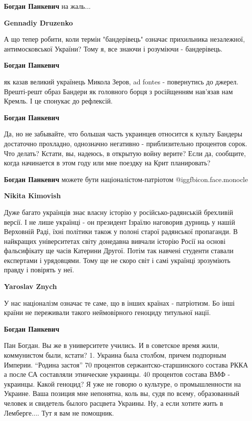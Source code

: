 \begin{itemize}
\begin{itemize} %
\textbf{Богдан Панкевич} на жаль...

\textbf{Gennadiy Druzenko} 

А що тепер робити, коли термін "бандерівець" означає прихильника незалежної,
антимосковської України? Тому я, все знаючи і розуміючи - бандерівець.

\textbf{Богдан Панкевич} 

як казав великий українець Микола Зеров, ad fontes - повернутись до джерел.
Врешті-решт образ Бандери як головного борця з російщенням нав’язав нам Кремль.
І це спонукає до рефлексій.

\textbf{Богдан Панкевич} 

Да, но не забывайте, что большая часть украинцев относится к культу Бандеры
достаточно прохладно, однозначно негативно - приблизительно процентов сорок.
Что делать? Кстати, вы, надеюсь, в открытую войну верите? Если да, сообщите,
когда начинается в этом году или мне поездку на Крит планировать?

\textbf{Богдан Панкевич} можете бути націоналістом-патріотом @igg{fbicon.face.monocle} 

\textbf{Nikita Kimovish} 

Дуже багато українців знає власну історію у російсько-радянській брехливій
версії. І не лише українці - он президент Ізраїлю наговорив дурниць у нашій
Верховній Раді, їхні політики також у полоні старої радянської пропаганди. В
найкращих університетах світу донедавна вивчали історію Росії на основі
фальсифікату ще часів Катерини Другої. Потім так навчені студенти ставали
експертами і урядовцями. Тому ще не скоро світ і самі українці зрозуміють
правду і повірять у неї.

\textbf{Yaroslav Znych} 

У нас націоналізм означає те саме, що в інших країнах - патріотизм. Бо інші
країни не переживали такого неймовірного геноциду титульної нації.

\textbf{Богдан Панкевич} 

Пан Богдан. Вы же в университете учились. И в советское время жили, коммунистом
были, кстати? 1. Украина была столбом, причем подпорным Империи. \enquote{Родина
застоя} 70 процентов сержантско-старшинского состава РККА а после СА составляли
этнические украинцы. 40 процентов состава ВМФ - украинцы. Какой геноцид? Я уже
не говорю о культуре, о промышленности на Украине. Ваша позиция мне непонятна,
коль вы, судя по всему, образованный человек и свидетель былого расцвета
Украины. Ну, а если хотите жить в Лемберге.... Тут я вам не помощник.


\end{itemize}
\end{itemize}
